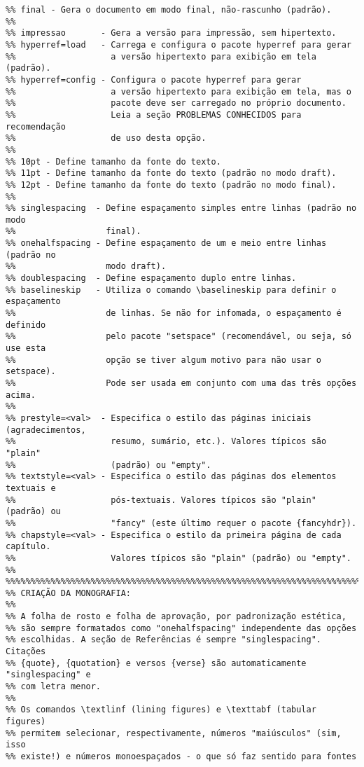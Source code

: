 \begin{verbatim}
%% final - Gera o documento em modo final, não-rascunho (padrão).
%%
%% impressao       - Gera a versão para impressão, sem hipertexto.
%% hyperref=load   - Carrega e configura o pacote hyperref para gerar
%%                   a versão hipertexto para exibição em tela (padrão).
%% hyperref=config - Configura o pacote hyperref para gerar
%%                   a versão hipertexto para exibição em tela, mas o
%%                   pacote deve ser carregado no próprio documento.
%%                   Leia a seção PROBLEMAS CONHECIDOS para recomendação
%%                   de uso desta opção.
%%
%% 10pt - Define tamanho da fonte do texto.
%% 11pt - Define tamanho da fonte do texto (padrão no modo draft).
%% 12pt - Define tamanho da fonte do texto (padrão no modo final).
%%
%% singlespacing  - Define espaçamento simples entre linhas (padrão no modo
%%                  final).
%% onehalfspacing - Define espaçamento de um e meio entre linhas (padrão no
%%                  modo draft).
%% doublespacing  - Define espaçamento duplo entre linhas.
%% baselineskip   - Utiliza o comando \baselineskip para definir o espaçamento
%%                  de linhas. Se não for infomada, o espaçamento é definido 
%%                  pelo pacote "setspace" (recomendável, ou seja, só use esta
%%                  opção se tiver algum motivo para não usar o setspace).
%%                  Pode ser usada em conjunto com uma das três opções acima.
%%
%% prestyle=<val>  - Especifica o estilo das páginas iniciais (agradecimentos,
%%                   resumo, sumário, etc.). Valores típicos são "plain"
%%                   (padrão) ou "empty".
%% textstyle=<val> - Especifica o estilo das páginas dos elementos textuais e
%%                   pós-textuais. Valores típicos são "plain" (padrão) ou
%%                   "fancy" (este último requer o pacote {fancyhdr}).
%% chapstyle=<val> - Especifica o estilo da primeira página de cada capítulo.
%%                   Valores típicos são "plain" (padrão) ou "empty".
%%
%%%%%%%%%%%%%%%%%%%%%%%%%%%%%%%%%%%%%%%%%%%%%%%%%%%%%%%%%%%%%%%%%%%%%%%%%%%%%%%
%% CRIAÇÃO DA MONOGRAFIA:
%%
%% A folha de rosto e folha de aprovação, por padronização estética,
%% são sempre formatados como "onehalfspacing" independente das opções
%% escolhidas. A seção de Referências é sempre "singlespacing". Citações
%% {quote}, {quotation} e versos {verse} são automaticamente "singlespacing" e
%% com letra menor.
%%
%% Os comandos \textlinf (lining figures) e \texttabf (tabular figures)
%% permitem selecionar, respectivamente, números "maiúsculos" (sim, isso
%% existe!) e números monoespaçados - o que só faz sentido para fontes 

\end{verbatim}
